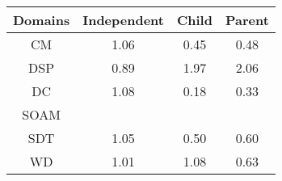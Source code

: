 \begin{tabular}{|c||c|c|c|}
\hline
Domains & Independent & Child & Parent \\ 
\hline
CM & \cellcolor[rgb]{0.8890320258858067,0.8300678017353821,0.42} 1.06 & \cellcolor[rgb]{0.8088436947614369,0.3611934885374683,0.32558744844400783} 0.45 & \cellcolor[rgb]{0.8145429051646738,0.3881697511127889,0.33090671148702877} 0.48 \\ 
\hline
DSP & \cellcolor[rgb]{0.8904143940724271,0.7472947986094882,0.4017201011342653} 0.89 & \cellcolor[rgb]{0.562506213462784,0.6753976800613187,0.42} 1.97 & \cellcolor[rgb]{0.53,0.66,0.42} 2.06 \\ 
\hline
DC & \cellcolor[rgb]{0.8802003987564672,0.8258843994109581,0.42} 1.08 & \cellcolor[rgb]{0.76,0.13,0.28} 0.18 & \cellcolor[rgb]{0.7873852686791675,0.2596236050813925,0.3055595841005563} 0.33 \\ 
\hline
SOAM &  &  &  \\ 
\hline
SDT & \cellcolor[rgb]{0.8919148115761625,0.8314333317992348,0.42} 1.05 & \cellcolor[rgb]{0.818279239897471,0.40585506884802885,0.33439395723763954} 0.50 & \cellcolor[rgb]{0.8370225695308282,0.49457349577925364,0.3518877315621064} 0.60 \\ 
\hline
WD & \cellcolor[rgb]{0.9074301738711193,0.8387827139389512,0.42} 1.01 & \cellcolor[rgb]{0.8817460361421474,0.826616543435754,0.42} 1.08 & \cellcolor[rgb]{0.8422746850559901,0.51943350926502,0.35678970605225746} 0.63 \\ 
\hline
\end{tabular}